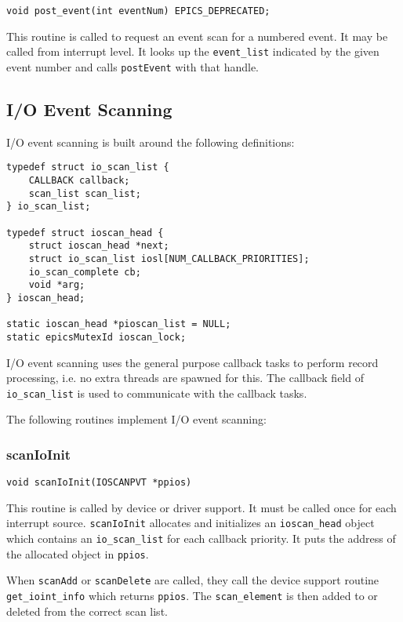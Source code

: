 \begin{verbatim}
void post_event(int eventNum) EPICS_DEPRECATED;
\end{verbatim}

This routine is called to request an event scan for a numbered event.
It may be called from interrupt level.
It looks up the \verb|event_list| indicated by the given event number and calls \verb|postEvent| with that handle.

\subsection{I/O Event Scanning}

I/O event scanning is built around the following definitions:

\begin{verbatim}
typedef struct io_scan_list {
    CALLBACK callback;
    scan_list scan_list;
} io_scan_list;

typedef struct ioscan_head {
    struct ioscan_head *next;
    struct io_scan_list iosl[NUM_CALLBACK_PRIORITIES];
    io_scan_complete cb;
    void *arg;
} ioscan_head;

static ioscan_head *pioscan_list = NULL;
static epicsMutexId ioscan_lock;
\end{verbatim}

I/O event scanning uses the general purpose callback tasks to perform record processing, i.e. no extra threads are spawned for this.
The callback field of \verb|io_scan_list| is used to communicate with the callback tasks.

The following routines implement I/O event scanning:

\subsubsection{scanIoInit}

\begin{verbatim}
void scanIoInit(IOSCANPVT *ppios)
\end{verbatim}

This routine is called by device or driver support.
It must be called once for each interrupt source.
\verb|scanIoInit| allocates and initializes an \verb|ioscan_head| object which contains an \verb|io_scan_list| for each callback priority.
It puts the address of the allocated object in \verb|ppios|.

When \verb|scanAdd| or \verb|scanDelete| are called, they call the device support routine \verb|get_ioint_info| which returns \verb|ppios|.
The \verb|scan_element| is then added to or deleted from the correct scan list.


